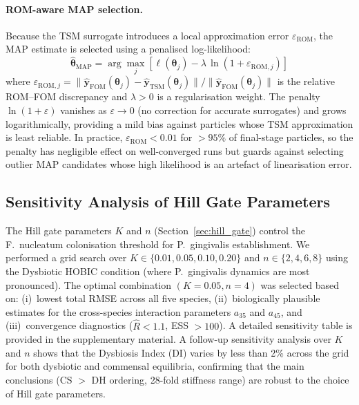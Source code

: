 \documentclass[11pt,a4paper]{article}
\begin{document}
\paragraph{ROM-aware MAP selection.}
Because the TSM surrogate introduces a local approximation error $\varepsilon_\mathrm{ROM}$, the MAP estimate is selected using a penalised log-likelihood:
\begin{equation}
  \hat{\boldsymbol{\theta}}_\mathrm{MAP} = \arg\max_j \left[\ell(\boldsymbol{\theta}_j) - \lambda\,\ln(1 + \varepsilon_{\mathrm{ROM},j})\right]
  \label{eq:rom_penalty}
\end{equation}
where $\varepsilon_{\mathrm{ROM},j} = \lVert\hat{\mathbf{y}}_\mathrm{FOM}(\boldsymbol{\theta}_j) - \hat{\mathbf{y}}_\mathrm{TSM}(\boldsymbol{\theta}_j)\rVert / \lVert\hat{\mathbf{y}}_\mathrm{FOM}(\boldsymbol{\theta}_j)\rVert$ is the relative ROM--FOM discrepancy and $\lambda > 0$ is a regularisation weight.
The penalty $\ln(1+\varepsilon)$ vanishes as $\varepsilon \to 0$ (no correction for accurate surrogates) and grows logarithmically, providing a mild bias against particles whose TSM approximation is least reliable.
In practice, $\varepsilon_\mathrm{ROM} < 0.01$ for $>95\%$ of final-stage particles, so the penalty has negligible effect on well-converged runs but guards against selecting outlier MAP candidates whose high likelihood is an artefact of linearisation error.

\subsection{Sensitivity Analysis of Hill Gate Parameters}
\label{sec:sensitivity_kn}

The Hill gate parameters $K$ and $n$ (Section~\ref{sec:hill_gate}) control the F.~nucleatum colonisation threshold for P.~gingivalis establishment. We performed a grid search over $K \in \{0.01, 0.05, 0.10, 0.20\}$ and $n \in \{2, 4, 6, 8\}$ using the Dysbiotic HOBIC condition (where P.~gingivalis dynamics are most pronounced). The optimal combination $(K=0.05, n=4)$ was selected based on: (i)~lowest total RMSE across all five species, (ii)~biologically plausible estimates for the cross-species interaction parameters $a_{35}$ and $a_{45}$, and (iii)~convergence diagnostics ($\hat{R} < 1.1$, ESS $> 100$). A detailed sensitivity table is provided in the supplementary material. A follow-up sensitivity analysis over $K$ and $n$ shows that the Dysbiosis Index (DI) varies by less than 2\% across the grid for both dysbiotic and commensal equilibria, confirming that the main conclusions (CS $>$ DH ordering, 28-fold stiffness range) are robust to the choice of Hill gate parameters.
\end{document}
